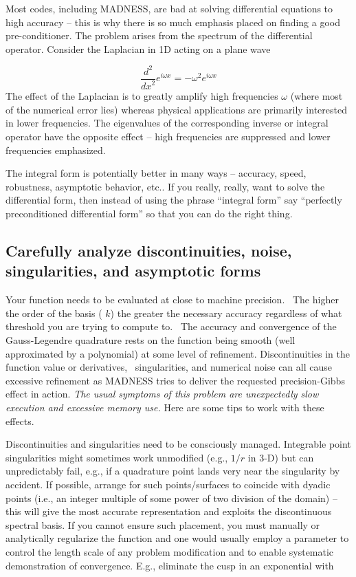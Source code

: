 \documentclass[letterpaper]{article}
\begin{document}
\bigskip

Most codes, including MADNESS, are bad at solving differential equations to high accuracy -- this is why there is so
much emphasis placed on finding a good pre-conditioner. The problem arises from the spectrum of the differential
operator. Consider the Laplacian in 1D acting on a plane wave 

\begin{equation}
\frac{d^{2}}{\mathit{dx}^{2}}e^{i\omega x}=-\omega ^{2}e^{i\omega x}
\end{equation}
The effect of the Laplacian is to greatly amplify high frequencies  $\omega $ (where most of the numerical error lies)
whereas physical applications are primarily interested in lower frequencies. The eigenvalues of the corresponding
inverse or integral operator have the opposite effect -- high frequencies are suppressed and lower frequencies
emphasized.

The integral form is potentially better in many ways -- accuracy, speed, robustness, asymptotic behavior, etc.. If you
really, really, want to solve the differential form, then instead of using the phrase ``integral form'' say ``perfectly
preconditioned differential form'' so that you can do the right thing.

\subsection{Carefully analyze discontinuities, noise, singularities, and asymptotic forms}
Your function needs to be evaluated at close to machine precision. \ The higher the order of the basis ( $k$) the
greater the necessary accuracy regardless of what threshold you are trying to compute to. \ The accuracy and
convergence of the Gauss-Legendre quadrature rests on the function being smooth (well approximated by a polynomial) at
some level of refinement. Discontinuities in the function value or derivatives, \ singularities, and numerical noise
can all cause excessive refinement as MADNESS tries to deliver the requested precision-Gibbs effect in action.
\textit{The usual symptoms of this problem are unexpectedly slow execution and excessive memory use.} Here are some
tips to work with these effects.

Discontinuities and singularities need to be consciously managed. Integrable point singularities might sometimes work
unmodified (e.g.,  $1/r$ in 3-D) but can unpredictably fail, e.g., if a quadrature point lands very near the
singularity by accident. If possible, arrange for such points/surfaces to coincide with dyadic points (i.e., an integer
multiple of some power of two division of the domain) -- this will give the most accurate representation and exploits
the discontinuous spectral basis. If you cannot ensure such placement, you must manually or analytically regularize the
function and one would usually employ a parameter to control the length scale of any problem modification and to enable
systematic demonstration of convergence. E.g., eliminate the cusp in an exponential with
\end{document}
